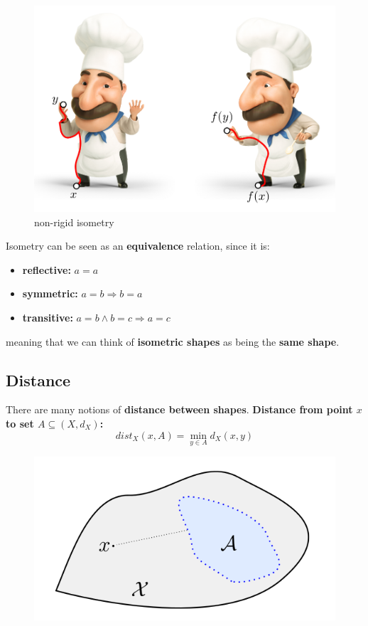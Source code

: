 \documentclass[11pt]{article}
\begin{document}
\begin{figure}[H]
\includegraphics[scale=0.3]{res/images/quasi_iso.png}
\centering
\caption{non-rigid isometry}
\label{}
\end{figure}

Isometry can be seen as an \textbf{equivalence} relation, since it is:
\begin{itemize}
	\item \textbf{reflective:} $a=a$
	\item \textbf{symmetric:} $a=b \Rightarrow b=a$
	\item \textbf{transitive:} $a=b  \wedge b=c \Rightarrow a=c$
\end{itemize}
meaning that we can think of \textbf{isometric shapes} as being the \textbf{same shape}.

\subsection{Distance}
There are many notions of \textbf{distance between shapes}.
\textbf{Distance from point $x$ to set $A \subseteq (X, d_X)$:}
\begin{equation}
	dist_X(x,A) = \min_{y \in A} d_X(x,y)
\end{equation}

\begin{figure}[H]
\includegraphics[scale=0.3]{res/images/dist.png}
\centering
\label{}
\end{figure}
\end{document}
